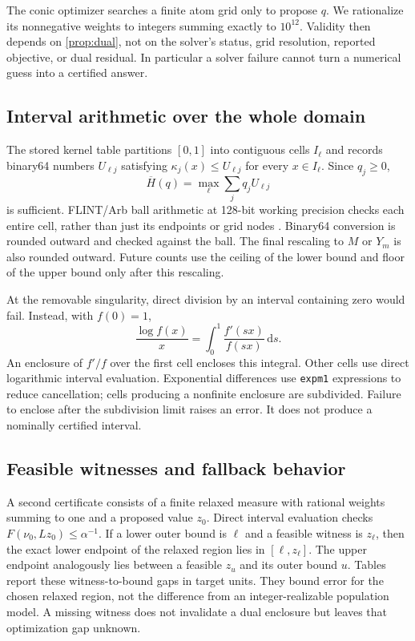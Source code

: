\documentclass[11pt]{article}
\theoremstyle{remark}\newtheorem{remark}[theorem]{Remark}
\newcommand{\dd}{\,\mathrm d}\newcommand{\ind}{\mathbf1}
\begin{document}
The conic optimizer searches a finite atom grid only to propose $q$. We
rationalize its nonnegative weights to integers summing exactly to $10^{12}$.
Validity then depends on \cref{prop:dual}, not on the solver's status, grid
resolution, reported objective, or dual residual. In particular a solver
failure cannot turn a numerical guess into a certified answer.

\subsection{Interval arithmetic over the whole domain}
The stored kernel table partitions $[0,1]$ into contiguous cells $I_\ell$ and
records binary64 numbers $U_{\ell j}$ satisfying
$\kappa_j(x)\le U_{\ell j}$ for every $x\in I_\ell$. Since $q_j\ge0$,
\[
 \overline H(q)=\max_\ell\sum_jq_j U_{\ell j}
\]
is sufficient. FLINT/Arb ball arithmetic at 128-bit working precision checks
each entire cell, rather than just its endpoints or grid nodes
\cite{Johansson2017,PythonFlint}. Binary64 conversion is rounded outward and
checked against the ball. The final rescaling to $M$ or $Y_m$ is also rounded
outward. Future counts use the ceiling of the lower bound and floor of the
upper bound only after this rescaling.

At the removable singularity, direct division by an interval containing zero
would fail. Instead, with $f(0)=1$,
\[
 \frac{\log f(x)}x=\int_0^1\frac{f'(sx)}{f(sx)}\dd s.
\]
An enclosure of $f'/f$ over the first cell encloses this integral. Other cells
use direct logarithmic interval evaluation. Exponential differences use
\texttt{expm1} expressions to reduce cancellation; cells producing a nonfinite
enclosure are subdivided. Failure to enclose after the subdivision limit
raises an error. It does not produce a nominally certified interval.

\subsection{Feasible witnesses and fallback behavior}
A second certificate consists of a finite relaxed measure with rational
weights summing to one and a proposed value $z_0$. Direct interval evaluation
checks $F(\nu_0,Lz_0)\le\alpha^{-1}$. If a lower outer bound is $\ell$ and a
feasible witness is $z_\ell$, then the exact lower endpoint of the relaxed
region lies in $[\ell,z_\ell]$. The upper endpoint analogously lies between a
feasible $z_u$ and its outer bound $u$. Tables report these witness-to-bound
gaps in target units. They bound error for the chosen relaxed region, not the
difference from an integer-realizable population model. A missing witness
does not invalidate a dual enclosure but leaves that optimization gap unknown.
\end{document}
